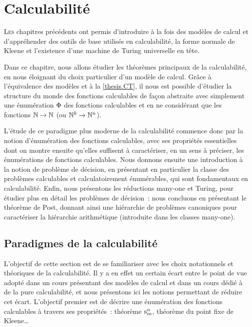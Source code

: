\chapter{Calculabilité}
\label{chp.calculabilite}

\minitoc

\lettrine{L}{es} chapitres précédents ont permis d'introduire à la fois des
modèles de calcul et d'appréhender des outils de base utilisés en
calculabilité, la forme normale de Kleene et l'existence d'une machine de
Turing universelle en tête.

Dans ce chapitre, nous allons étudier les théorèmes principaux de la
calculabilité, en nous éloignant du choix particulier d'un modèle de calcul.
Grâce à l'équivalence des modèles et à la \cref{thesis.CT}, il nous est possible
d'étudier la structure du monde des fonctions calculables de façon abstraite
avec simplement une énumération $\operatorname{\Phi}$ des fonctions calculables et en ne
considérant que les fonctions $\mathbb N \to \mathbb N$ (ou $\mathbb N^k \to \mathbb N^n$).

L'étude de ce paradigme plus moderne de la calculabilité commence donc par la
notion d'énumération des fonctions calculables, avec ses propriétés essentielles
dont on montre ensuite qu'elles suffisent à caractériser, en un sens à préciser,
les énumérations de fonctions calculables. Nous donnons ensuite une introduction
à la notion de problème de décision, en présentant en particulier la classe des
problèmes calculables et calculatoirement énumérables, qui sont fondamentaux en
calculabilité. Enfin, nous présentons les réductions many-one et Turing, pour
étudier plus en détail les problèmes de décision~: nous concluons en présentant
le théorème de Post, donnant ainsi une hiérarchie de problèmes canoniques pour
caractériser la hiérarchie arithmétique (introduite dans les classes many-one).

\section{Paradigmes de la calculabilité}

L'objectif de cette section est de se familiariser avec les choix notationnels
et théoriques de la calculabilité. Il y a en effet un certain écart entre
le point de vue adopté dans un cours présentant des modèles de calcul et dans un
cours dédié à de la pure calculabilité, et nous présentons ici les notions
permettant de réduire cet écart. L'objectif premier est de décrire une
énumération des fonctions calculables à travers ses propriétés~: théorème
$\mathrm{s}_{m}^{n}$, théorème du point fixe de Kleene\ldots

